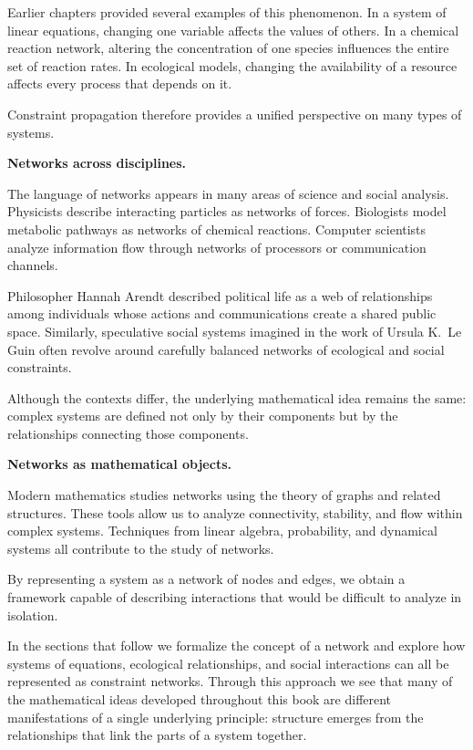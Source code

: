 \documentclass[11pt, openany]{book}
\theoremstyle{plain}
\theoremstyle{definition}
\theoremstyle{remark}
\begin{document}
Earlier chapters provided several examples of this phenomenon. In a
system of linear equations, changing one variable affects the values of
others. In a chemical reaction network, altering the concentration of
one species influences the entire set of reaction rates. In ecological
models, changing the availability of a resource affects every process
that depends on it.

Constraint propagation therefore provides a unified perspective on many
types of systems.

\medskip

\textbf{Networks across disciplines.}

The language of networks appears in many areas of science and social
analysis. Physicists describe interacting particles as networks of
forces. Biologists model metabolic pathways as networks of chemical
reactions. Computer scientists analyze information flow through networks
of processors or communication channels.

Philosopher Hannah Arendt described political life as a web of
relationships among individuals whose actions and communications create
a shared public space. Similarly, speculative social systems imagined in
the work of Ursula K.~Le Guin often revolve around carefully balanced
networks of ecological and social constraints.

Although the contexts differ, the underlying mathematical idea remains
the same: complex systems are defined not only by their components but
by the relationships connecting those components.

\medskip

\textbf{Networks as mathematical objects.}

Modern mathematics studies networks using the theory of graphs and
related structures. These tools allow us to analyze connectivity,
stability, and flow within complex systems. Techniques from linear
algebra, probability, and dynamical systems all contribute to the study
of networks.

By representing a system as a network of nodes and edges, we obtain a
framework capable of describing interactions that would be difficult to
analyze in isolation.

\medskip

In the sections that follow we formalize the concept of a network and
explore how systems of equations, ecological relationships, and social
interactions can all be represented as constraint networks. Through this
approach we see that many of the mathematical ideas developed throughout
this book are different manifestations of a single underlying
principle: structure emerges from the relationships that link the parts
of a system together.
\end{document}
